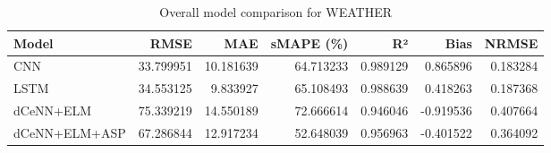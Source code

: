 \begin{table}
\caption{Overall model comparison for WEATHER}
\begin{tabular}{lrrrrrr}
\toprule
Model & RMSE & MAE & sMAPE (\%) & R² & Bias & NRMSE \\
\midrule
CNN & 33.799951 & 10.181639 & 64.713233 & 0.989129 & 0.865896 & 0.183284 \\
LSTM & 34.553125 & 9.833927 & 65.108493 & 0.988639 & 0.418263 & 0.187368 \\
dCeNN+ELM & 75.339219 & 14.550189 & 72.666614 & 0.946046 & -0.919536 & 0.407664 \\
dCeNN+ELM+ASP & 67.286844 & 12.917234 & 52.648039 & 0.956963 & -0.401522 & 0.364092 \\
\bottomrule
\end{tabular}
\end{table}

